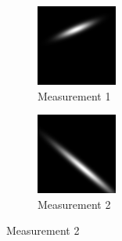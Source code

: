 \documentclass{article}
\begin{document}
        \begin{figure}
        \centering
        \begin{subfigure}{.3\textwidth}
          \centering
          \includegraphics[width=.8\linewidth]{images/GaussianLine1.png}
          \caption{Measurement 1}
          \label{fig:uncProdsub1}
        \end{subfigure}%
        \begin{subfigure}{.3\textwidth}
          \centering
          \includegraphics[width=.8\linewidth]{images/GaussianLine2.png}
          \caption{Measurement 2}
          \label{fig:uncProdsub2}

\end{subfigure}
\end{figure}
\end{document}
